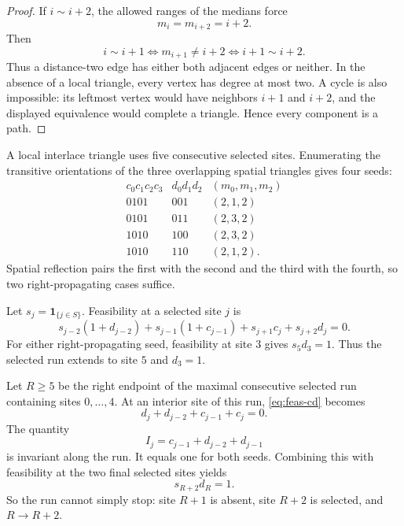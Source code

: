 \documentclass[10pt,letterpaper]{article}
\begin{document}
\begin{proof}
If \(i\sim i+2\), the allowed ranges of the medians force
\[
 m_i=m_{i+2}=i+2.
\]
Then
\[
 i\sim i+1
 \Longleftrightarrow m_{i+1}\ne i+2
 \Longleftrightarrow i+1\sim i+2.
\]
Thus a distance-two edge has either both adjacent edges or neither.  In the absence of a local triangle, every vertex has degree at most two.  A cycle is also impossible: its leftmost vertex would have neighbors \(i+1\) and \(i+2\), and the displayed equivalence would complete a triangle.  Hence every component is a path.
\end{proof}

A local interlace triangle uses five consecutive selected sites.  Enumerating the transitive orientations of the three overlapping spatial triangles gives four seeds:
\begin{equation}\label{eq:four-seeds}
\begin{array}{c|c|c}
 c_0c_1c_2c_3&d_0d_1d_2&(m_0,m_1,m_2)\\
\hline
0101&001&(2,1,2)\\
0101&011&(2,3,2)\\
1010&100&(2,3,2)\\
1010&110&(2,1,2).
\end{array}
\end{equation}
Spatial reflection pairs the first with the second and the third with the fourth, so two right-propagating cases suffice.

Let \(s_j=\mathbf1_{\{j\in S\}}\).  Feasibility at a selected site \(j\) is
\begin{equation}\label{eq:feas-cd}
 s_{j-2}(1+d_{j-2})+s_{j-1}(1+c_{j-1})
 +s_{j+1}c_j+s_{j+2}d_j=0.
\end{equation}
For either right-propagating seed, feasibility at site \(3\) gives \(s_5d_3=1\).  Thus the selected run extends to site \(5\) and \(d_3=1\).

Let \(R\ge5\) be the right endpoint of the maximal consecutive selected run containing sites \(0,\ldots,4\).  At an interior site of this run, \eqref{eq:feas-cd} becomes
\begin{equation}\label{eq:interior-recurrence}
 d_j+d_{j-2}+c_{j-1}+c_j=0.
\end{equation}
The quantity
\begin{equation}\label{eq:invariant-I}
 I_j=c_{j-1}+d_{j-2}+d_{j-1}
\end{equation}
is invariant along the run.  It equals one for both seeds.  Combining this with feasibility at the two final selected sites yields
\begin{equation}\label{eq:terminal-jump}
 s_{R+2}d_R=1.
\end{equation}
So the run cannot simply stop: site \(R+1\) is absent, site \(R+2\) is selected, and \(R\to R+2\).
\end{document}
